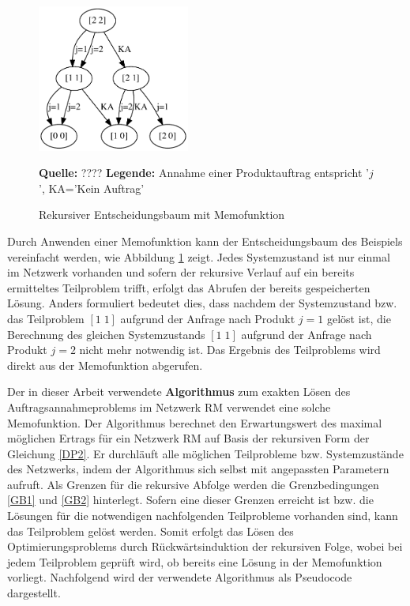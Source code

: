\begin{figure}[h!]
  \begin{center}
    \includegraphics[width=50mm]{Bilder/Einfach2.pdf}
    \caption{Rekursiver Entscheidungsbaum mit Memofunktion}  \label{Einfach2}
        {\footnotesize \textbf{Quelle:} ????} 
    {\footnotesize \textbf{Legende:} Annahme einer Produktauftrag entspricht '$j$', KA='Kein Auftrag'} 
  \end{center}
\end{figure}

Durch Anwenden einer Memofunktion kann der Entscheidungsbaum des Beispiels vereinfacht werden, wie Abbildung \ref{Einfach2} zeigt. Jedes Systemzustand ist nur einmal im Netzwerk vorhanden und sofern der rekursive Verlauf auf ein bereits ermitteltes Teilproblem trifft, erfolgt das Abrufen der bereits gespeicherten Lösung. Anders formuliert bedeutet dies, dass nachdem der Systemzustand bzw. das Teilproblem $[1\; 1]$ aufgrund der Anfrage nach Produkt $j=1$ gelöst ist, die Berechnung des gleichen Systemzustands $[1\; 1]$ aufgrund der Anfrage nach Produkt $j=2$ nicht mehr notwendig ist. Das Ergebnis des Teilproblems wird direkt aus der Memofunktion abgerufen.

Der in dieser Arbeit verwendete \textbf{Algorithmus} zum exakten Lösen des Auftragsannahmeproblems im Netzwerk RM verwendet eine solche Memofunktion. Der Algorithmus berechnet den Erwartungswert des maximal möglichen Ertrags für ein Netzwerk RM auf Basis der rekursiven Form der Gleichung \eqref{DP2}. Er durchläuft alle möglichen Teilprobleme bzw. Systemzustände des Netzwerks, indem der Algorithmus sich selbst mit angepassten Parametern aufruft. Als Grenzen für die rekursive Abfolge werden die Grenzbedingungen \eqref{GB1} und \eqref{GB2} hinterlegt. Sofern eine dieser Grenzen erreicht ist bzw. die Lösungen für die notwendigen nachfolgenden Teilprobleme vorhanden sind, kann das Teilproblem gelöst werden. Somit erfolgt das Lösen des Optimierungsproblems durch Rückwärtsinduktion der rekursiven Folge, wobei bei jedem Teilproblem geprüft wird, ob bereits eine Lösung in der Memofunktion vorliegt. Nachfolgend wird der verwendete Algorithmus als Pseudocode dargestellt.


